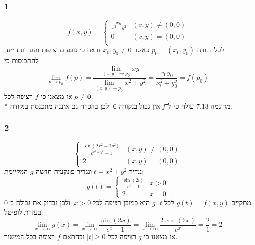 \subsubsection{1}
\[
	f(x, y) = \begin{cases}
		\frac{xy}{x^2 + y^2} & (x, y) \ne (0, 0) \\
		0 & (x, y) = (0, 0) \\
	\end{cases}
\]
לכל נקודה $p_0 = (x_0, y_0)$ כאשר $x_0, y_0 \ne 0$ נראה כי נובע מרציפות והגדרת היינה להתכנסות כי
\[
	\lim_{p \to p_0} f(p)
	= \frac{\lim_{(x, y) \to p_0} xy}{\lim_{(x, y) \to p_0} x^2 + y^2}
	= \frac{x_0y_0}{x_0^2 + y_0^2}
	= f(p_0)
\]
אז מצאנו כי $f$ רציפה לכל $p \ne \textbf{0}$. \\*
מדוגמה 7.13 עולה כי ל־$f$ אין גבול בנקודה $\textbf{0}$ ולכן בהכרח גם איננה מתכנסת בנקודה.

\subsubsection{2}
\[
	\begin{cases}
		\frac{\sin(2x^2 + 2y^2)}{e^{x^2 + y^2} - 1} & (x, y) \ne (0, 0)\\
		2 & (x, y) = (0, 0)
	\end{cases}
\]
נגדיר $t = x^2 + y^2$ ונגדיר פונקציה חדשה $g$ המקיימת:
\[
	g(t) = \begin{cases}
		\frac{\sin(2t)}{e^{t} - 1} & x > 0 \\
		2 & x = 0
	\end{cases}
\]
מתקיים  $g(t) = f(x, y)$ לכל $t$.
$g$ היא כמובן רציפה לכל $x > 0$, ולכן נבדוק את גבולה ב־$0$ בעזרת לופיטל:
\[
	\lim_{x \to \infty} g(x)
	= \lim_{x \to \infty} \frac{\sin(2x)}{e^x - 1}
	= \lim_{x \to \infty} \frac{2\cos(2x)}{e^x}
	= \frac{2}{1}
	= 2
\]
אז מצאנו כי $g$ רציפה לכל $|t| \ge 0$ ובהתאם $f$ רציפה בכל המישור.

